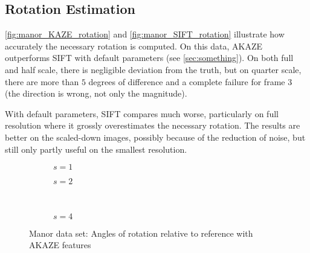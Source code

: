 \subsection{Rotation Estimation}

\autoref{fig:manor_KAZE_rotation} and \autoref{fig:manor_SIFT_rotation}
illustrate how accurately the necessary rotation is computed. On this data, AKAZE
outperforms SIFT with default parameters (see \autoref{sec:something}). On both full and
half scale, there is negligible deviation from the truth, but on quarter scale,
there are more than $5$ degrees of difference and a complete failure for frame
$3$ (the direction is wrong, not only the magnitude).

With default parameters, SIFT compares much worse, particularly on full
resolution where it grossly overestimates the necessary rotation. The results
are better on the scaled-down images, possibly because of the reduction of
noise, but still only partly useful on the smallest resolution.

\begin{figure}[h]
   \begin{subfigure}{.5\linewidth}
      \centering      
      
      \label{fig:manor_KAZE_rotation_1}
      \caption{$s=1$}
   \end{subfigure}
   \quad
   \begin{subfigure}{.5\linewidth}
      \centering      
      
      \label{fig:manor_KAZE_rotation_2}
      \caption{$s=2$}
   \end{subfigure}\\[3ex]
   \begin{subfigure}{\linewidth}
      \centering      
      
      \label{fig:manor_KAZE_rotation_4}
      \caption{$s=4$}
   \end{subfigure}
   \caption[Manor data: Rotation AKAZE]{Manor data set: Angles of rotation relative to reference with
   AKAZE features}
   \label{fig:manor_KAZE_rotation}
\end{figure}

